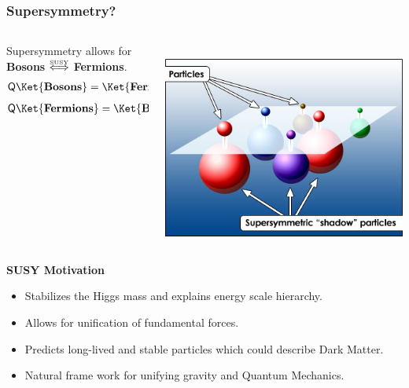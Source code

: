 \documentclass{beamer}
\begin{document}
\begin{frame}
\frametitle{Supersymmetry?}
\begin{minipage}[t]{\linewidth}
  \begin{columns}
    \begin{column}{0.6\textwidth}
Supersymmetry allows for \\
 \textbf{Bosons} $ \mathrel{\overset{\makebox[0pt]{\mbox{\normalfont\tiny SUSY}}}{\Longleftrightarrow}} $ \textbf{Fermions}.
\begin{align*}
 \mathsf{Q}\Ket{\mathbf{Bosons}} &= \Ket{\mathbf{Fermions}} 
 \end{align*}
 \begin{align*}
 \mathsf{Q}\Ket{ \mathbf{Fermions}} &= \Ket{\mathbf{Bosons}}
 \end{align*}
 
    \end{column}
    \begin{column}{0.4\textwidth}
     \mbox{
    \includegraphics[height=0.65\textwidth,width=0.30\paperwidth]{THESISPLOTS/New-Physics-PLOTS/sypersymmetry.jpg}}
    \end{column}
 \end{columns}    

\end{minipage}
\begin{minipage}[t]{\linewidth}
  \begin{varblock}[7cm]{\textbf{SUSY Motivation}}
  \begin{itemize}
   \item Stabilizes the Higgs mass and explains energy scale hierarchy.
   \item Allows for unification of fundamental forces.
   \item Predicts long-lived and stable particles which could describe Dark Matter.
   \item Natural frame work for unifying gravity and Quantum Mechanics.
  \end{itemize}
  \end{varblock}
\end{minipage}
\end{frame}
\end{document}

